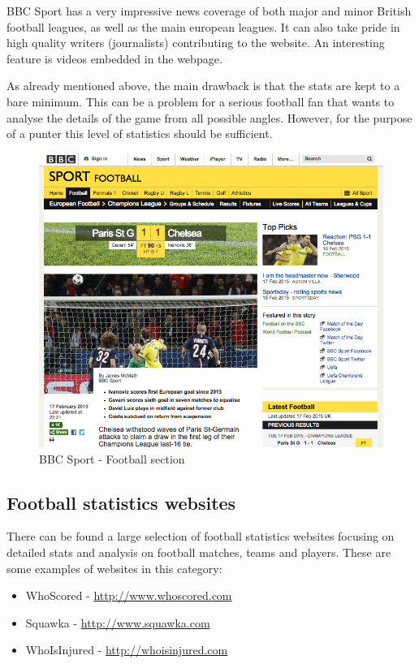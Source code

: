 BBC Sport has a very impressive news coverage of both major and minor British football leagues, as well as the main european leagues. It can also take pride in high quality writers (journalists) contributing to the website. An interesting feature is videos embedded in the webpage.

As already mentioned above, the main drawback is that the stats are kept to a bare minimum. This can be a problem for a serious football fan that wants to analyse the details of the game from all possible angles. However, for the purpose of a punter this level of statistics should be sufficient.
	
\begin{figure}[H]
	\begin{center}
		\includegraphics[width=.80\linewidth,natwidth=610,natheight=642]{req/images/bbcsport.png}
		\caption{BBC Sport - Football section} \label{fig:using:bbcsport}
	\end{center}
\end{figure}
		
\subsection{Football statistics websites}
\label{subsec:footballstatswebsites_req}
There can be found a large selection of football statistics websites focusing on detailed stats and analysis on football matches, teams and players. These are some examples of websites in this category:
			
\begin{itemize}
	\item WhoScored - \url{http://www.whoscored.com}
	\item Squawka - \url{http://www.squawka.com}
	\item WhoIsInjured 	- \url{http://whoisinjured.com}
\end{itemize}

